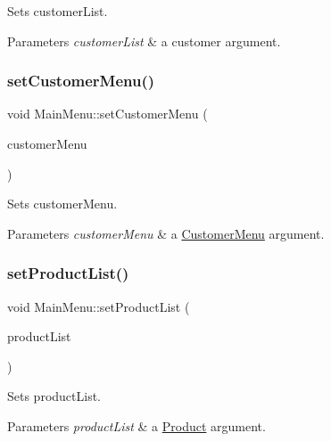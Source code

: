Sets customer\+List. 


\begin{DoxyParams}{Parameters}
{\em customer\+List} & a customer argument. \\
\hline
\end{DoxyParams}
\mbox{\label{classMainMenu_a5c80f2e447ac6fca73b1527f9abd74b6}} 
\subsubsection{\texorpdfstring{set\+Customer\+Menu()}{setCustomerMenu()}}
{\footnotesize\ttfamily void Main\+Menu\+::set\+Customer\+Menu (\begin{DoxyParamCaption}\item[{\hyperlink{classCustomerMenu}{Customer\+Menu} $\ast$}]{customer\+Menu }\end{DoxyParamCaption})}



Sets customer\+Menu. 


\begin{DoxyParams}{Parameters}
{\em customer\+Menu} & a \hyperlink{classCustomerMenu}{Customer\+Menu} argument. \\
\hline
\end{DoxyParams}
\mbox{\label{classMainMenu_aae749e64ea9bf630ae4340a446bcf8a7}} 
\subsubsection{\texorpdfstring{set\+Product\+List()}{setProductList()}}
{\footnotesize\ttfamily void Main\+Menu\+::set\+Product\+List (\begin{DoxyParamCaption}\item[{const vector$<$ \hyperlink{classProduct}{Product} $\ast$$>$ \&}]{product\+List }\end{DoxyParamCaption})}



Sets product\+List. 


\begin{DoxyParams}{Parameters}
{\em product\+List} & a \hyperlink{classProduct}{Product} argument. \\
\hline
\end{DoxyParams}
\mbox{\label{classMainMenu_aaca12cbc08bfe9533544375cd8da5a8e}} 
